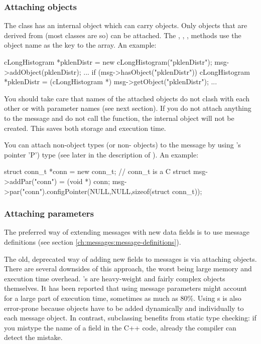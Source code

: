 \subsubsection{Attaching objects}

The  class has an internal  object which can
carry objects. Only objects
that are derived from  (most {\opp} classes are so) can be attached.
The , , ,
 methods use the object name
as the key to the array. An example:

\begin{cpp}
cLongHistogram *pklenDistr = new cLongHistogram("pklenDistr");
msg->addObject(pklenDistr);
...
if (msg->hasObject("pklenDistr"))
{
   cLongHistogram *pklenDistr =
       (cLongHistogram *) msg->getObject("pklenDistr");
   ...
}
\end{cpp}

You should take care that names of the attached objects do not
clash with each other or with  parameter names
(see next section).
If you do not attach anything to the message and do not call the
 function, the internal  object
will not be created.
This saves both storage and execution time.

You can attach non-object types (or non- objects) to
the message by using
's  pointer 'P') type (see later in the description
of ). An example:

\begin{cpp}
struct conn_t *conn = new conn_t; // conn_t is a C struct
msg->addPar("conn") = (void *) conn;
msg->par("conn").configPointer(NULL,NULL,sizeof(struct conn_t));
\end{cpp}




\subsubsection{Attaching parameters}

The preferred way of extending messages with new data fields is to use
message definitions (see section \ref{ch:messages:message-definitions}).

The old, deprecated way of adding new fields to messages is via
attaching  objects.
There are several downsides of this approach, the worst being
large memory and execution time overhead. 's are
heavy-weight and fairly complex objects themselves.
It has been reported that using  message parameters
might account for a large part of execution time, sometimes as much as 80\%.
Using s is also error-prone because  objects
have to be added dynamically and individually to each message object.
In contrast, subclassing benefits from static type checking:
if you mistype the name of a field in the C++ code, already the compiler
can detect the mistake.

